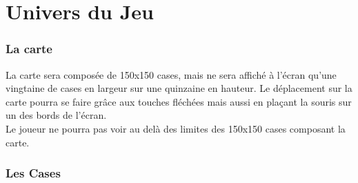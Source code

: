 \documentclass[a4paper]{article}
\begin{document}

  \newpage
  \part{Univers du Jeu}
    \section{La carte}

      La carte sera composée de 150x150 cases, mais ne sera affiché à l'écran qu'une vingtaine de cases en largeur sur une quinzaine en hauteur. Le déplacement sur la carte pourra se faire grâce aux touches fléchées mais aussi en plaçant la souris sur un des bords de l'écran.\\
      Le joueur ne pourra pas voir au delà des limites des 150x150 cases composant la carte.

    \section{Les Cases}
\end{document}

